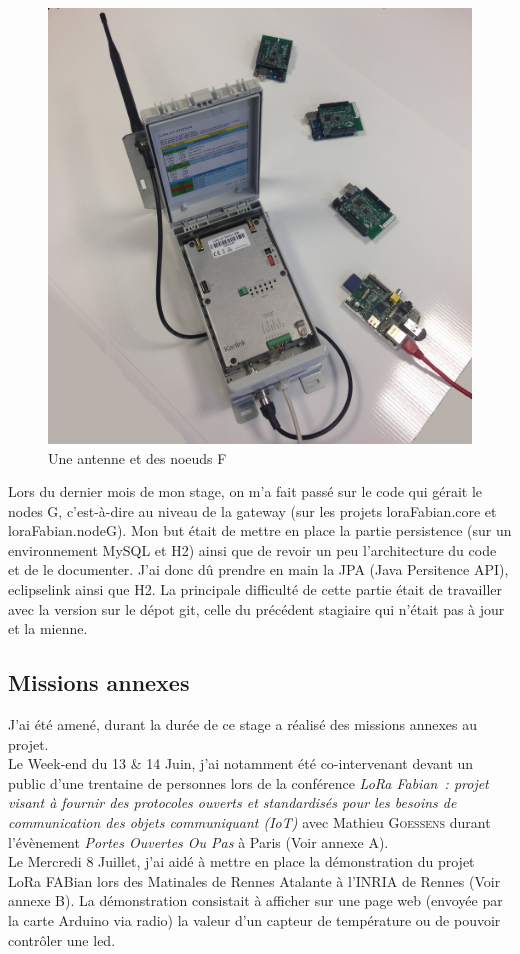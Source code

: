 \documentclass{article}
\begin{document}
\begin{figure}[h]
	\begin{center}
		\includegraphics[scale=0.09]{../res/img/antennaNodeF}
		\caption{Une antenne et des noeuds F}
		\label{fig:matoslora}
	\end{center}
\end{figure}

Lors du dernier mois de mon stage, on m'a fait passé sur le code qui gérait le nodes G, c'est-à-dire au niveau de la gateway (sur les projets loraFabian.core et loraFabian.nodeG). Mon but était de mettre en place la partie persistence (sur un environnement MySQL et H2) ainsi que de revoir un peu l'architecture du code et de le documenter. J'ai donc dû prendre en main la JPA (Java Persitence API), eclipselink ainsi que H2. La principale difficulté de cette partie était de travailler avec la version sur le dépot git, celle du précédent stagiaire qui n'était pas à jour et la mienne.
\subsection{Missions annexes}
J'ai été amené, durant la durée de ce stage a réalisé des missions annexes au projet.\\
Le Week-end du 13 \& 14 Juin, j'ai notamment été co-intervenant devant un public d'une trentaine de personnes lors de la conférence \emph{LoRa Fabian~:  projet visant à fournir des protocoles ouverts et standardisés pour les besoins de communication des objets communiquant (IoT)} avec Mathieu \textsc{Goessens} durant l'évènement \emph{Portes Ouvertes Ou Pas} à Paris (Voir annexe A).\\
Le Mercredi 8 Juillet, j'ai aidé à mettre en place la démonstration du projet LoRa FABian lors des Matinales de Rennes Atalante à l'\textsc{INRIA} de Rennes (Voir annexe B). La démonstration consistait à afficher sur une page web (envoyée par la carte Arduino via radio) la valeur d'un capteur de température ou de pouvoir contrôler une led.
\end{document}
